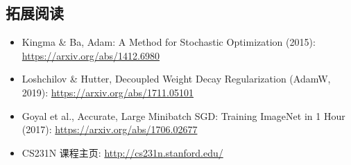 \subsection{拓展阅读}

\begin{itemize}
    \item Kingma \& Ba, Adam: A Method for Stochastic Optimization (2015): \url{https://arxiv.org/abs/1412.6980}
    \item Loshchilov \& Hutter, Decoupled Weight Decay Regularization (AdamW, 2019): \url{https://arxiv.org/abs/1711.05101}
    \item Goyal et al., Accurate, Large Minibatch SGD: Training ImageNet in 1 Hour (2017): \url{https://arxiv.org/abs/1706.02677}
    \item CS231N 课程主页: \url{http://cs231n.stanford.edu/}
\end{itemize}


